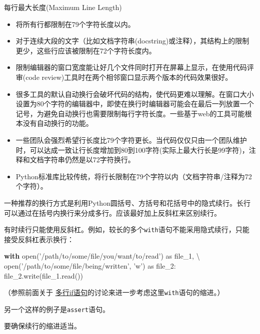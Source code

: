 \documentclass[ignorenonframetext,9pt]{beamer}
\newenvironment{Shaded}{}{}
\newcommand{\BuiltInTok}[1]{#1}
\newcommand{\ControlFlowTok}[1]{\textcolor[rgb]{0.00,0.44,0.13}{\textbf{#1}}}
\newcommand{\ImportTok}[1]{#1}
\newcommand{\NormalTok}[1]{#1}
\newcommand{\OperatorTok}[1]{\textcolor[rgb]{0.40,0.40,0.40}{#1}}
\newcommand{\StringTok}[1]{\textcolor[rgb]{0.25,0.44,0.63}{#1}}
\begin{document}
\begin{frame}{每行最大长度(Maximum Line Length)}

\begin{block}

\begin{itemize}
\item 将所有行都限制在79个字符长度以内。

\item 对于连续大段的文字（比如文档字符串(docstring)或注释），其结构上的限制更少，这些行应该被限制在72个字符长度内。

\item 限制编辑器的窗口宽度能让好几个文件同时打开在屏幕上显示，在使用代码评审(code
review)工具时在两个相邻窗口显示两个版本的代码效果很好。

\item 很多工具的默认自动换行会破坏代码的结构，使代码更难以理解。在窗口大小设置为80个字符的编辑器中，即使在换行时编辑器可能会在最后一列放置一个记号，为避免自动换行也需要限制每行字符长度。一些基于web的工具可能根本没有自动换行的功能。

\item 一些团队会强烈希望行长度比79个字符更长。当代码仅仅只由一个团队维护时，可以达成一致让行长度增加到80到100字符(实际上最大行长是99字符)，注释和文档字符串仍然是以72字符换行。

\item Python标准库比较传统，将行长限制在79个字符以内（文档字符串/注释为72个字符）。

\end{itemize}
\end{block}

\end{frame}

\begin{frame}[fragile]

一种推荐的换行方式是利用Python圆括号、方括号和花括号中的隐式续行。长行可以通过在括号内换行来分成多行。应该最好加上反斜杠来区别续行。

有时续行只能使用反斜杠。例如，较长的多个\texttt{with}语句不能采用隐式续行，只能接受反斜杠表示换行：

\begin{Shaded}
\begin{Highlighting}[]
\ControlFlowTok{with} \BuiltInTok{open}\NormalTok{(}\StringTok{'/path/to/some/file/you/want/to/read'}\NormalTok{) }\ImportTok{as}\NormalTok{ file_1, }\OperatorTok{\textbackslash{}}
     \BuiltInTok{open}\NormalTok{(}\StringTok{'/path/to/some/file/being/written'}\NormalTok{, }\StringTok{'w'}\NormalTok{) }\ImportTok{as}\NormalTok{ file_2:}
\NormalTok{    file_2.write(file_1.read())}
\end{Highlighting}
\end{Shaded}

（参照前面关于
\protect\hyperlink{ux7f29ux8fdbux28Indentationux29}{多行if语句}的讨论来进一步考虑这里\texttt{with}语句的缩进。）

另一个这样的例子是\texttt{assert}语句。

要确保续行的缩进适当。

\end{frame}
\end{document}
